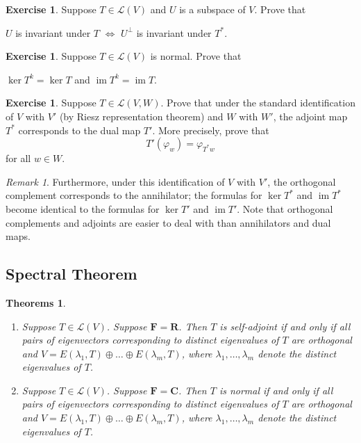 \documentclass[nofonts,colorlinks]{tufte-handout}
\theoremstyle{plain} %
\newtheorem{thms}[thm]{Theorems}
\theoremstyle{definition}
\newtheorem{exer}[thm]{Exercise}
\theoremstyle{remark}
\newtheorem{rmk}[thm]{Remark}
\renewcommand{\phi}{\varphi}
\newcommand{\R}{\mathbf{R}}
\newcommand{\C}{\mathbf{C}}
\newcommand{\F}{\mathbf{F}}
\renewcommand{\L}{\mathcal{L}}
\DeclareMathOperator{\im}{im}
\begin{document}
\begin{exer}
	Suppose $T\in\L(V)$ and $U$ is a subspace of $V$. Prove that
	\begin{center}
		$U$ is invariant under $T$ $\iff$ $U^\perp$ is invariant under $T^*$.
	\end{center}
\end{exer}

\begin{exer}
	Suppose $T\in\L(V)$ is normal. Prove that
	\begin{center}
		$\ker T^k=\ker T$ \quad and \quad $\im T^k=\im T$.
	\end{center}
\end{exer}

\begin{exer}
	Suppose $T\in\L(V,W)$. Prove that under the standard identification of $V$ with $V'$ (by Riesz representation theorem) and $W$ with $W'$, the adjoint map $T^*$ corresponds to the dual map $T'$. More precisely, prove that
	\[T'(\phi_w)=\phi_{T^*w}\]
	for all $w\in W$.
\end{exer}

\begin{rmk}
	Furthermore, under this identification of $V$ with $V'$, the orthogonal complement corresponds to the annihilator; the formulas for $\ker T^*$ and $\im T^*$ become identical to the formulas for $\ker T'$ and $\im T'$. Note that orthogonal complements and adjoints are easier to deal with than annihilators and dual maps.
\end{rmk}


\subsection{Spectral Theorem}
\begin{thms}
	\begin{enumerate}
		\item Suppose $T\in\L(V)$. Suppose $\F=\R$. Then $T$ is self-adjoint if and only if all pairs of eigenvectors corresponding to distinct eigenvalues of $T$ are orthogonal and $V=E(\lambda_1,T)\oplus\dots\oplus E(\lambda_m,T)$, where $\lambda_1,\dots,\lambda_m$ denote the distinct eigenvalues of $T$.
		\item Suppose $T\in\L(V)$. Suppose $\F=\C$. Then $T$ is normal if and only if all pairs of eigenvectors corresponding to distinct eigenvalues of $T$ are orthogonal and $V=E(\lambda_1,T)\oplus\dots\oplus E(\lambda_m,T)$, where $\lambda_1,\dots,\lambda_m$ denote the distinct eigenvalues of $T$.
	\end{enumerate}
\end{thms}
\end{document}
